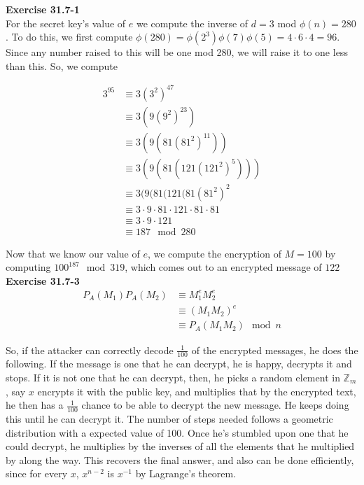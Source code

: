 \documentclass{article}
\newcommand{\Z}{\mathbb{Z}}
\begin{document}
\noindent\textbf{Exercise 31.7-1}\\

For the secret key's value of $e$ we compute the inverse of $d=3$ mod $\phi(n) = 280$. To do this, we first compute $\phi(280) = \phi(2^3)\phi(7)\phi(5) = 4\cdot 6\cdot 4 = 96$. Since any number raised to this will be one mod 280, we will raise it to one less than this. So, we compute 

\begin{align*}
3^{95} &\equiv 3 (3^2)^{47} \\
&\equiv 3(9(9^2)^{23})\\
& \equiv 3(9(81(81^2)^{11}))\\
& \equiv 3(9(81(121(121^2)^5)))\\
& \equiv 3(9(81(121(81(81^2)^2\\
& \equiv 3\cdot 9\cdot 81 \cdot 121 \cdot 81 \cdot81\\
& \equiv 3\cdot 9 \cdot 121 \\
& \equiv 187 \mod 280
\end{align*}

Now that we know our value of $e$, we compute the encryption of $M=100$ by computing $100^{187} \mod 319$, which comes out to an encrypted message of $122$\\



\noindent\textbf{Exercise 31.7-3}\\

\begin{align*}
P_A(M_1)P_A(M_2) &\equiv M_1^e M_2^e\\
&\equiv (M_1 M_2)^e \\
&\equiv P_A(M_1M_2) \mod n
\end{align*}

So, if the attacker can correctly decode $\frac{1}{100}$ of the encrypted messages, he does the following. If the message is one that he can decrypt, he is happy, decrypts it and stops. If it is not one that he can decrypt, then, he picks a random element in $\Z_m$, say $x$ encrypts it with the public key, and multiplies that by the encrypted text, he then has a $\frac{1}{100}$ chance to be able to decrypt the new message. He keeps doing this until he can decrypt it. The number of steps needed follows a geometric distribution with a expected value of 100. Once he's stumbled upon one that he could decrypt, he multiplies by the inverses of all the elements that he multiplied by along the way. This recovers the final answer, and also can be done efficiently, since for every $x$, $x^{n-2}$ is $x^{-1}$ by Lagrange's theorem.\\ 
\end{document}
